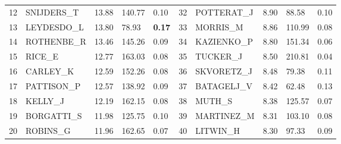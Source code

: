 \documentclass[11pt]{article} %
\begin{document}
\begin{table}
\begin{center}
\begin{tabular}{c|l|l|l|l|c|l|l|l|l|}
12	&SNIJDERS\_T	&13.88	&140.77	&0.10	      & 32	&POTTERAT\_J	&8.90	&88.58	&0.10		   \\
13	&LEYDESDO\_L	&13.80	&78.93	&\textbf{0.17}	      & 33	&MORRIS\_M	&8.86	&110.99	&0.08		   \\
14	&ROTHENBE\_R	&13.46	&145.26	&0.09	      & 34	&KAZIENKO\_P	&8.80	&151.34	&0.06		   \\
15	&RICE\_E		&12.77	&163.03	&0.08	      & 35	&TUCKER\_J	&8.50	&210.81	&0.04		   \\
16	&CARLEY\_K	&12.59	&152.26	&0.08	      & 36	&SKVORETZ\_J	&8.48	&79.38	&0.11		   \\
17	&PATTISON\_P	&12.57	&138.92	&0.09	      & 37	&BATAGELJ\_V	&8.42	&62.48	&0.13		   \\
18	&KELLY\_J		&12.19	&162.15	&0.08	      & 38	&MUTH\_S		&8.38	&125.57	&0.07	   \\
19	&BORGATTI\_S	&11.98	&125.75	&0.10	      & 39	&MARTINEZ\_M	&8.31	&103.10	&0.08		   \\
20	&ROBINS\_G	&11.96	&162.65	&0.07	      & 40	&LITWIN\_H	&8.30	&97.33	&0.09		   \\ \hline 
\end{tabular} 
\end{center}
\end{table}  
\end{document}

